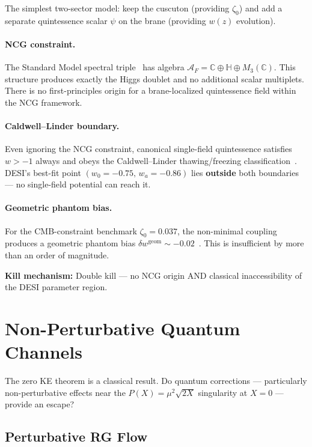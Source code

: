 The simplest two-sector model: keep the cuscuton (providing $\zeta_0$) and add a separate quintessence scalar $\psi$ on the brane (providing $w(z)$ evolution).

\paragraph{NCG constraint.} The Standard Model spectral triple~\cite{ch3:chamseddine1997,ch3:connes1994} has algebra $\mathcal{A}_F = \mathbb{C} \oplus \mathbb{H} \oplus M_3(\mathbb{C})$. This structure produces exactly the Higgs doublet and no additional scalar multiplets. There is no first-principles origin for a brane-localized quintessence field within the NCG framework.

\paragraph{Caldwell--Linder boundary.} Even ignoring the NCG constraint, canonical single-field quintessence satisfies $w > -1$ always and obeys the Caldwell--Linder thawing/freezing classification~\cite{ch3:caldwell2005}. DESI's best-fit point $(w_0 = -0.75,\, w_a = -0.86)$ lies \textbf{outside} both boundaries --- no single-field potential can reach it.

\paragraph{Geometric phantom bias.} For the CMB-constraint benchmark $\zeta_0 = 0.037$, the non-minimal coupling produces a geometric phantom bias $\delta w^{\mathrm{geom}} \sim -0.02$~\cite{ch3:paper1}. This is insufficient by more than an order of magnitude.

\textbf{Kill mechanism:} Double kill --- no NCG origin AND classical inaccessibility of the DESI parameter region.

\section{Non-Perturbative Quantum Channels}
\label{sec:3-quantum}

The zero KE theorem is a classical result. Do quantum corrections --- particularly non-perturbative effects near the $P(X) = \mu^2\sqrt{2X}$ singularity at $X = 0$ --- provide an escape?

\subsection{Perturbative RG Flow}
\label{sec:3-pertrg}

